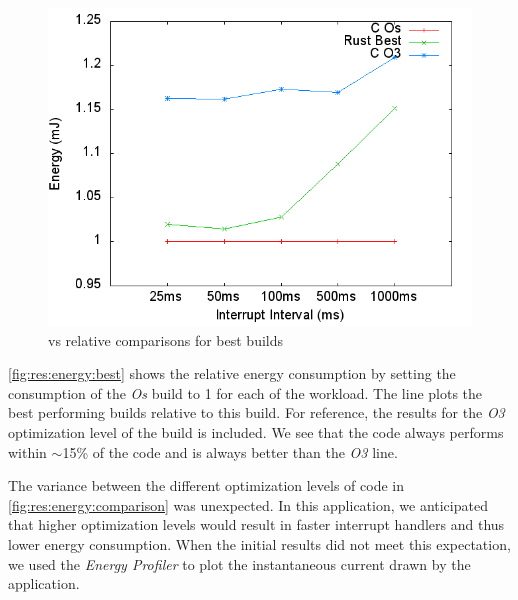 \begin{figure}[H]
  \includegraphics[width=\textwidth]{results/plots/energy/best.png}
  \caption{{\rust} vs {\C} relative comparisons for best builds}
  \label{fig:res:energy:best}
\end{figure}

\autoref{fig:res:energy:best} shows the relative energy consumption by setting the consumption of the {\C} \emph{Os} build to 1 for each of the workload.
The {\rust} line plots the best performing {\rust} builds relative to this {\C} build.
For reference, the results for the \emph{O3} optimization level of the {\C} build is included.
We see that the {\rust} code always performs within $\sim$15\% of the {\C} code and is always better than the \emph{O3} line.


The variance between the different optimization levels of {\C} code in \autoref{fig:res:energy:comparison} was unexpected.
In this application, we anticipated that higher optimization levels would result in faster interrupt handlers and thus lower energy consumption.
When the initial results did not meet this expectation, we used the \emph{Energy Profiler} to plot the instantaneous current drawn by the application.


